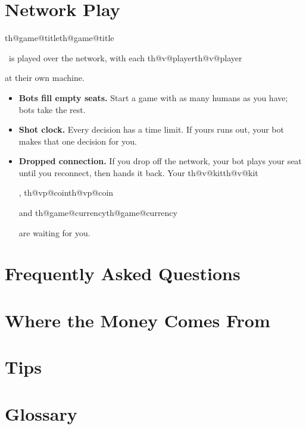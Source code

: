 \documentclass[11pt,letterpaper]{article}
\makeatletter
\newcommand{\th@get}[1]{\ifcsname #1\endcsname\csname #1\endcsname\else
  \PackageError{theme}{Unknown theme key '#1'}{Check theme/theme.toml}\fi}
\newcommand{\Game}[1]{\th@get{th@game@#1}}
\newcommand{\V}[1]{\th@get{th@v@#1}}
\newcommand{\Vp}[1]{\th@get{th@vp@#1}}
\newcommand{\game}{\Game{title}}
\makeatother
\begin{document}
\section{Network Play}
\game\ is played over the network, with each \V{player} at their own machine.
\begin{itemize}
  \item \textbf{Bots fill empty seats.} Start a game with as many humans as you have; bots take the rest.
  \item \textbf{Shot clock.} Every decision has a time limit. If yours runs out, your bot makes that one decision for you.
  \item \textbf{Dropped connection.} If you drop off the network, your bot plays your seat until you reconnect, then hands
    it back. Your \V{kit}, \Vp{coin} and \Game{currency} are waiting for you.
\end{itemize}

\section{Frequently Asked Questions}


\section{Where the Money Comes From}


\section{Tips}


\section{Glossary}


\clearpage
\end{document}
